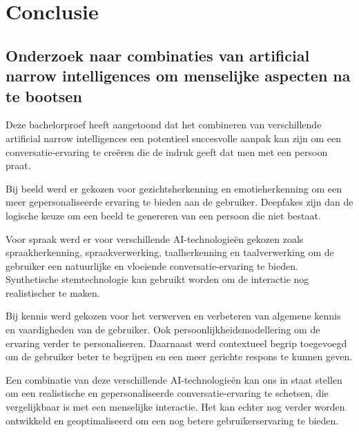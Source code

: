 
\chapter{Conclusie}
\label{ch:conclusie}


\section{Onderzoek naar combinaties van artificial narrow intelligences om menselijke aspecten na te bootsen}

Deze bachelorproef heeft aangetoond dat het combineren van verschillende artificial narrow intelligences een potentieel succesvolle aanpak kan zijn om een conversatie-ervaring te creëren die de indruk geeft dat men met een persoon praat.

Bij beeld werd er gekozen voor gezichtsherkenning en emotieherkenning om een meer gepersonaliseerde ervaring te bieden aan de gebruiker. Deepfakes zijn dan de logische keuze om een beeld te genereren van een persoon die niet bestaat.

Voor spraak werd er voor verschillende AI-technologieën gekozen zoals spraakherkenning, spraakverwerking, taalherkenning en taalverwerking om de gebruiker een natuurlijke en vloeiende conversatie-ervaring te bieden. Synthetische stemtechnologie kan gebruikt worden om de interactie nog realistischer te maken.

Bij kennis werd gekozen voor het verwerven en verbeteren van algemene kennis en vaardigheden van de gebruiker. Ook persoonlijkheidsmodellering om de ervaring verder te personaliseren. Daarnaast werd contextueel begrip toegevoegd om de gebruiker beter te begrijpen en een meer gerichte respons te kunnen geven.

Een combinatie van deze verschillende AI-technologieën kan ons in staat stellen om een realistische en gepersonaliseerde conversatie-ervaring te schetsen, die vergelijkbaar is met een menselijke interactie. Het kan echter nog verder worden ontwikkeld en geoptimaliseerd om een nog betere gebruikerservaring te bieden.

